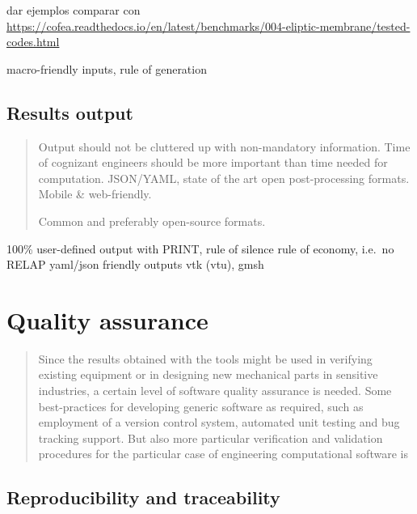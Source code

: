 \documentclass[
  american,
]{article}
\begin{document}
dar ejemplos comparar con
\url{https://cofea.readthedocs.io/en/latest/benchmarks/004-eliptic-membrane/tested-codes.html}

macro-friendly inputs, rule of generation

\hypertarget{sec:output}{%
\subsection{Results output}\label{sec:output}}

\begin{quote}
Output should not be cluttered up with non-mandatory information. Time
of cognizant engineers should be more important than time needed for
computation. JSON/YAML, state of the art open post-processing formats.
Mobile \& web-friendly.

Common and preferably open-source formats.
\end{quote}

100\% user-defined output with PRINT, rule of silence rule of economy,
i.e.~no RELAP yaml/json friendly outputs vtk (vtu), gmsh

\hypertarget{sec:qa}{%
\section{Quality assurance}\label{sec:qa}}

\begin{quote}
Since the results obtained with the tools might be used in verifying
existing equipment or in designing new mechanical parts in sensitive
industries, a certain level of software quality assurance is needed.
Some best-practices for developing generic software as required, such as
employment of a version control system, automated unit testing and bug
tracking support. But also more particular verification and validation
procedures for the particular case of engineering computational software
is
\end{quote}

\hypertarget{reproducibility-and-traceability}{%
\subsection{Reproducibility and
traceability}\label{reproducibility-and-traceability}}
\end{document}
